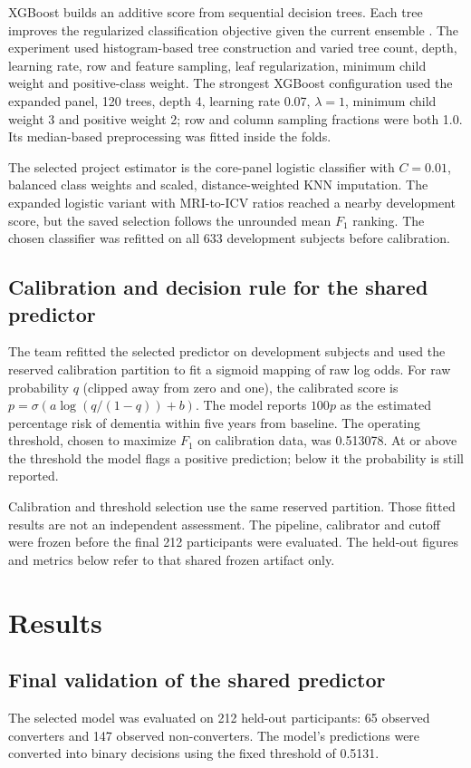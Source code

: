 \documentclass[11pt,a4paper]{article}
\begin{document}
XGBoost builds an additive score from sequential decision trees. Each tree improves the regularized classification objective given the current ensemble \cite{xgb}. The experiment used histogram-based tree construction and varied tree count, depth, learning rate, row and feature sampling, leaf regularization, minimum child weight and positive-class weight. The strongest XGBoost configuration used the expanded panel, 120 trees, depth 4, learning rate 0.07, $\lambda=1$, minimum child weight 3 and positive weight 2; row and column sampling fractions were both 1.0. Its median-based preprocessing was fitted inside the folds.

The selected project estimator is the core-panel logistic classifier with $C=0.01$, balanced class weights and scaled, distance-weighted KNN imputation. The expanded logistic variant with MRI-to-ICV ratios reached a nearby development score, but the saved selection follows the unrounded mean $F_1$ ranking. The chosen classifier was refitted on all 633 development subjects before calibration.
\subsection{Calibration and decision rule for the shared predictor}
The team refitted the selected predictor on development subjects and used the reserved calibration partition to fit a sigmoid mapping of raw log odds. For raw probability $q$ (clipped away from zero and one), the calibrated score is $p=\sigma(a\log(q/(1-q))+b)$. The model reports $100p$ as the estimated percentage risk of dementia within five years from baseline. The operating threshold, chosen to maximize $F_1$ on calibration data, was 0.513078. At or above the threshold the model flags a positive prediction; below it the probability is still reported.

Calibration and threshold selection use the same reserved partition. Those fitted results are not an independent assessment. The pipeline, calibrator and cutoff were frozen before the final 212 participants were evaluated. The held-out figures and metrics below refer to that shared frozen artifact only.
\clearpage
\section{Results}
\subsection{Final validation of the shared predictor}
The selected model was evaluated on 212 held-out participants: 65 observed converters and 147 observed non-converters. The model's predictions were converted into binary decisions using the fixed threshold of 0.5131.
\end{document}
